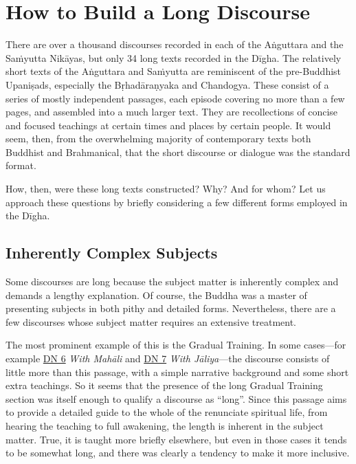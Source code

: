 \documentclass[12pt,openany]{book}%
\begin{document}
\section*{How to Build a Long Discourse}

There are over a thousand discourses recorded in each of the \textsanskrit{Aṅguttara} and the \textsanskrit{Saṁyutta} \textsanskrit{Nikāyas}, but only 34 long texts recorded in the \textsanskrit{Dīgha}. The relatively short texts of the \textsanskrit{Aṅguttara} and \textsanskrit{Saṁyutta} are reminiscent of the pre-Buddhist \textsanskrit{Upaniṣads}, especially the \textsanskrit{Bṛhadāraṇyaka} and Chandogya. These consist of a series of mostly independent passages, each episode covering no more than a few pages, and assembled into a much larger text. They are recollections of concise and focused teachings at certain times and places by certain people. It would seem, then, from the overwhelming majority of contemporary texts both Buddhist and Brahmanical, that the short discourse or dialogue was the standard format.

How, then, were these long texts constructed? Why? And for whom? Let us approach these questions by briefly considering a few different forms employed in the \textsanskrit{Dīgha}.

\subsection*{Inherently Complex Subjects}

Some discourses are long because the subject matter is inherently complex and demands a lengthy explanation. Of course, the Buddha was a master of presenting subjects in both pithy and detailed forms. Nevertheless, there are a few discourses whose subject matter requires an extensive treatment.

The most prominent example of this is the Gradual Training. In some cases—for example \href{https://suttacentral.net/dn6}{DN 6} \textit{With \textsanskrit{Mahāli}} and \href{https://suttacentral.net/dn7}{DN 7} \textit{With \textsanskrit{Jāliya}}—the discourse consists of little more than this passage, with a simple narrative background and some short extra teachings. So it seems that the presence of the long Gradual Training section was itself enough to qualify a discourse as “long”. Since this passage aims to provide a detailed guide to the whole of the renunciate spiritual life, from hearing the teaching to full awakening, the length is inherent in the subject matter. True, it is taught more briefly elsewhere, but even in those cases it tends to be somewhat long, and there was clearly a tendency to make it more inclusive.
\end{document}
